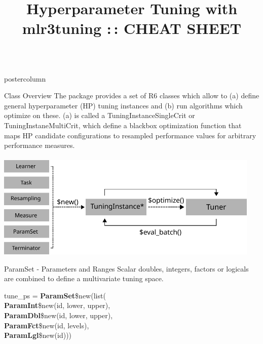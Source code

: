 \documentclass{beamer}
\title{Hyperparameter Tuning with mlr3tuning :\,: CHEAT SHEET} %
\newlength{\columnheight} %
\begin{document}
\begin{frame}[fragile]{}
	\begin{columns}
		\begin{column}{.245\textwidth}
			\begin{beamercolorbox}[center]{postercolumn}
				\begin{minipage}{.98\textwidth}
					\parbox[t][\columnheight]{\textwidth}{
						\begin{myblock}{Class Overview}
							The package provides a set of R6 classes which allow to (a) define general
							hyperparameter (HP) tuning instances and (b) run algorithms which optimize on these.
							(a) is called a TuningInstanceSingleCrit or TuningInstaneMultiCrit, which define a blackbox optimization function that maps HP candidate configurations to resampled performance values for arbitrary performance measures.\\
							\\
							\includegraphics[width=0.95\textwidth]{img/class_diagram.pdf}
						\end{myblock}
						\begin{myblock}{ParamSet - Parameters and Ranges}
							Scalar doubles, integers, factors or logicals are combined to define a multivariate tuning space.
							\\
							\begin{codeboxmultiline}[width=20.75cm]
								tune\_ps = \textbf{ParamSet}\$new(list(\\
								\hspace*{1ex}\textbf{ParamInt}\$new(id, lower, upper),\\
								\hspace*{1ex}\textbf{ParamDbl}\$new(id, lower, upper),\\
								\hspace*{1ex}\textbf{ParamFct}\$new(id, levels),\\
								\hspace*{1ex}\textbf{ParamLgl}\$new(id)))

\end{codeboxmultiline}
\end{myblock}}
\end{minipage}
\end{beamercolorbox}
\end{column}
\end{columns}
\end{frame}
\end{document}
